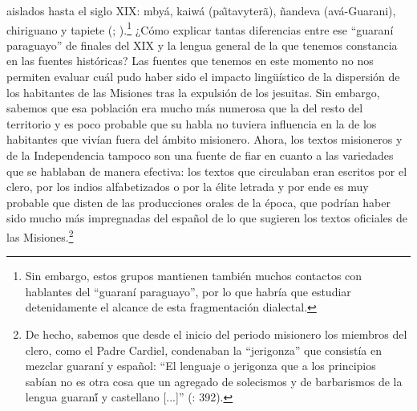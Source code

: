 \documentclass[output=paper]{langscibook}
\begin{document}
\largerpage[-1]
aislados hasta el siglo XIX: mbyá, kaiwá (pa\~\i tavyterã), ñandeva (avá-Guarani), chiriguano y tapiete (\citealt{Dietrich2010}; \citealt{Cerno2017}).\footnote{Sin embargo, estos grupos mantienen también muchos contactos con hablantes del “guaraní paraguayo”, por lo que habría que estudiar detenidamente el alcance de esta fragmentación dialectal.} ¿Cómo explicar tantas diferencias entre ese “guaraní paraguayo” de finales del XIX y la lengua general de la que tenemos constancia en las fuentes históricas? Las fuentes que tenemos en este momento no nos permiten evaluar cuál pudo haber sido el impacto lingüístico de la dispersión de los habitantes de las Misiones tras la expulsión de los jesuitas. Sin embargo, sabemos que esa población era mucho más numerosa que la del resto del territorio y es poco probable que su habla no tuviera influencia en la de los habitantes que vivían fuera del ámbito misionero. Ahora, los textos misioneros y de la Independencia tampoco son una fuente de fiar en cuanto a las variedades que se hablaban de manera efectiva: los textos que circulaban eran escritos por el clero, por los indios alfabetizados o por la élite letrada y por ende es muy probable que disten de las producciones orales de la época, que podrían haber sido mucho más impregnadas del español de lo que sugieren los textos oficiales de las Misiones.\footnote{De hecho, sabemos que desde el inicio del periodo misionero los miembros del clero, como el Padre Cardiel, condenaban la “jerigonza” que consistía en mezclar guaraní y español: “El lenguaje o jerigonza que a los principios sabían no es otra cosa que un agregado de solecismos y de barbarismos de la lengua guaran\'{í} y castellano [...]” (\citealt{Cardiel1900}: 392).}
\end{document}
